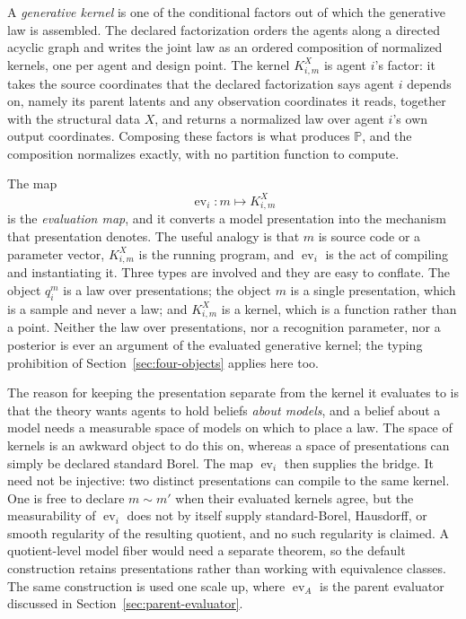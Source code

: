 \documentclass[11pt,letterpaper]{article}
\newcommand{\Prob}{\mathbb P}
\newcommand{\ev}{\operatorname{ev}}
\begin{document}
A \emph{generative kernel} is one of the conditional factors out of which the generative law is assembled. The declared factorization orders the agents along a directed acyclic graph and writes the joint law as an ordered composition of normalized kernels, one per agent and design point. The kernel \(K_{i,m}^{X}\) is agent \(i\)'s factor: it takes the source coordinates that the declared factorization says agent \(i\) depends on, namely its parent latents and any observation coordinates it reads, together with the structural data \(X\), and returns a normalized law over agent \(i\)'s own output coordinates. Composing these factors is what produces \(\Prob\), and the composition normalizes exactly, with no partition function to compute.

The map
\[
  \ev_i:m\longmapsto K_{i,m}^{X}
\]
is the \emph{evaluation map}, and it converts a model presentation into the mechanism that presentation denotes. The useful analogy is that \(m\) is source code or a parameter vector, \(K_{i,m}^{X}\) is the running program, and \(\ev_i\) is the act of compiling and instantiating it. Three types are involved and they are easy to conflate. The object \(q_i^m\) is a law over presentations; the object \(m\) is a single presentation, which is a sample and never a law; and \(K_{i,m}^{X}\) is a kernel, which is a function rather than a point. Neither the law over presentations, nor a recognition parameter, nor a posterior is ever an argument of the evaluated generative kernel; the typing prohibition of Section~\ref{sec:four-objects} applies here too.

The reason for keeping the presentation separate from the kernel it evaluates to is that the theory wants agents to hold beliefs \emph{about models}, and a belief about a model needs a measurable space of models on which to place a law. The space of kernels is an awkward object to do this on, whereas a space of presentations can simply be declared standard Borel. The map \(\ev_i\) then supplies the bridge. It need not be injective: two distinct presentations can compile to the same kernel. One is free to declare \(m\sim m'\) when their evaluated kernels agree, but the measurability of \(\ev_i\) does not by itself supply standard-Borel, Hausdorff, or smooth regularity of the resulting quotient, and no such regularity is claimed. A quotient-level model fiber would need a separate theorem, so the default construction retains presentations rather than working with equivalence classes. The same construction is used one scale up, where \(\ev_A\) is the parent evaluator discussed in Section~\ref{sec:parent-evaluator}.
\end{document}
